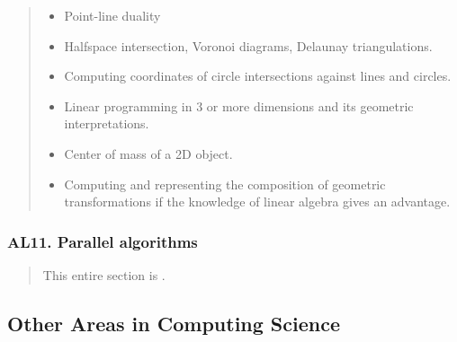 \documentclass[a4paper,11pt,oneside]{article}
\newcommand{\xmark}{\ding{55}}%
\newcommand{\Cnofocus}{{\small\faQuestion}}
\newcommand{\Cexcluded}{{\small\xmark}}
\newcommand{\Iexcluded}{\item[\hbox to 1.8em{\Cexcluded\hfill}]}
\newenvironment{myitemize}{\begin{quote}\begin{itemize}\itemsep 0pt}{\end{itemize}\end{quote}}
\begin{document}
    \begin{myitemize}
    \Iexcluded Point-line duality
    \Iexcluded Halfspace intersection, Voronoi diagrams, Delaunay triangulations.
    \Iexcluded Computing coordinates of circle intersections against lines and circles.
    \Iexcluded Linear programming in 3 or more dimensions and its geometric interpretations.
    \Iexcluded Center of mass of a 2D object.
    \Iexcluded Computing and representing the composition of geometric transformations if the knowledge of linear algebra gives an advantage.
    \end{myitemize}

    \subsubsection*{AL11. Parallel algorithms}%

    \begin{quote}
    This entire section is \Cnofocus.
    \end{quote}


\subsection{Other Areas in Computing Science}%
\label{subsubsec:other-areas}
\end{document}
